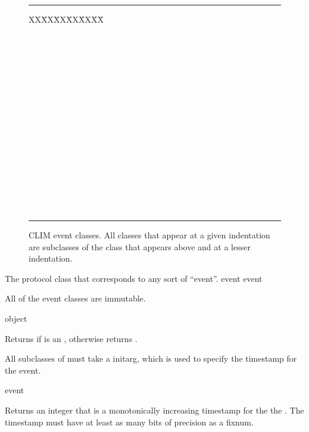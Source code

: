 \begin{figure}
\hrule
\begin{tabbing}
XX\=XX\=XX\=XX\=XX\=XX\=  \kill
{} \\
\>          \\
\>\>      \\
\>\>\>   \\
\>\>\> \\
\>\>       \\
\>\>\> \\
\>\>\>\>   \\
\>\>\>\> \\
\>\>\>\>    \\
\>\>\>  \\
\>\>\>\> \\
\>\>\>\>  \\
\> \\
\>\> \\
\>\>       \\
\> \\
\end{tabbing}
\caption{\label{event-hier} CLIM event classes.  All classes that appear
at a given indentation are subclasses of the class that appears above and at a
lesser indentation.} 
\vspace{2pc}
\hrule
\end{figure}


The protocol class that corresponds to any sort of ``event''.
 {event} {event}

All of the event classes are immutable.

 {object}

Returns  if  is an , otherwise returns
.


All subclasses of  must take a  initarg, which is used
to specify the timestamp for the event.

 {event}

Returns an integer that is a monotonically increasing timestamp for the the
 .  The timestamp must have at least as many bits of
precision as a fixnum.

